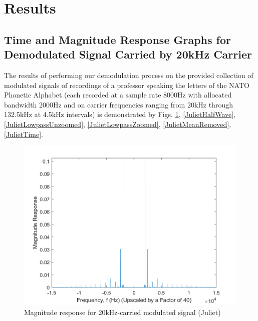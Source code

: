 \documentclass[journal]{IEEEtran}
\begin{document}
\section{Results}
\subsection{Time and Magnitude Response Graphs for Demodulated Signal Carried by 20kHz Carrier}
The results of performing our demodulation process on the provided collection of modulated signals of recordings of a professor speaking the letters of the NATO Phonetic Alphabet (each recorded at a sample rate 8000Hz with allocated bandwidth 2000Hz and on carrier frequencies ranging from 20kHz through 132.5kHz at 4.5kHz intervals) is demonstrated by Figs. \ref{JulietBandpass}, \ref{JulietHalfWave}, \ref{JulietLowpassUnzoomed}, \ref{JulietLowpassZoomed}, \ref{JulietMeanRemoved}, \ref{JulietTime}. 
\begin{figure}[!htb]
	\centering
  \includegraphics[width=\columnwidth]{JulietBandpassMag.png}
    \caption{Magnitude response for 20kHz-carried modulated signal (Juliet)}   
    \label{JulietBandpass}
\end{figure}
\end{document}
